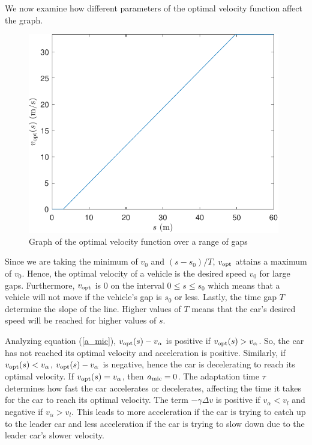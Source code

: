 \documentclass[12pt]{article}
\begin{document}
    We now examine how different parameters of the optimal velocity function affect the graph. 
    \begin{figure}[H]
        \includegraphics[width=11cm]{vopt_versus_s.pdf}
        \centering
        \caption{Graph of the optimal velocity function over a range of gaps}
    \end{figure}
    Since we are taking the minimum of $v_0$ and $(s-s_0)/T$, $v_{\rm opt}$ attains a maximum of $v_0$. Hence, the optimal velocity of a vehicle is the desired speed $v_0$ for large gaps. Furthermore, $v_{\rm opt}$ is $0$ on the interval $0 \leq s \leq s_0$ which means that a vehicle will not move if the vehicle's gap is $s_0$ or less. Lastly, the time gap $T$ determine the slope of the line. Higher values of $T$ means that the car's desired speed will be reached for higher values of $s$.
    
    Analyzing equation (\ref{a_mic}), $v_{\rm opt} (s) - v_\alpha$ is positive if $v_{\rm opt} (s) > v_\alpha$. So, the car has not reached its optimal velocity and acceleration is positive. Similarly, if  $v_{\rm opt} (s) < v_\alpha$, $v_{\rm opt} (s) - v_\alpha$ is negative, hence the car is decelerating to reach its optimal velocity. If $v_{\rm opt} (s) = v_\alpha$, then $a_{\rm mic} = 0$. The adaptation time $\tau$ determines how fast the car accelerates or decelerates, affecting the time it takes for the car to reach its optimal velocity. The term $-\gamma \Delta v$ is positive if $v_\alpha < v_l$ and negative if $v_\alpha > v_l$. This leads to more acceleration if the car is trying to catch up to the leader car and less acceleration if the car is trying to slow down due to the leader car's slower velocity. 
  
\end{document}
